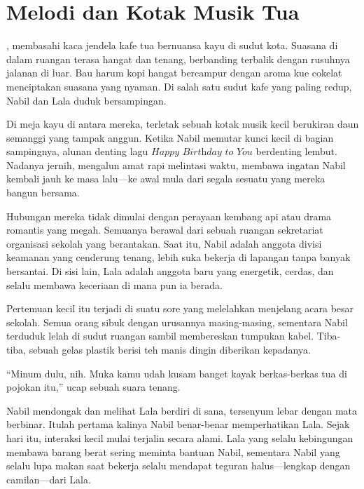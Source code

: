 \chapter*{Melodi dan Kotak Musik Tua}

, membasahi kaca jendela kafe tua bernuansa kayu di sudut kota. Suasana di dalam ruangan terasa hangat dan tenang, berbanding terbalik dengan rusuhnya jalanan di luar. Bau harum kopi hangat bercampur dengan aroma kue cokelat menciptakan suasana yang nyaman. Di salah satu sudut kafe yang paling redup, Nabil dan Lala duduk bersampingan.

Di meja kayu di antara mereka, terletak sebuah kotak musik kecil berukiran daun semanggi yang tampak anggun. Ketika Nabil memutar kunci kecil di bagian sampingnya, alunan denting lagu \(\textit{Happy Birthday to You}\) berdenting lembut. Nadanya jernih, mengalun amat rapi melintasi waktu, membawa ingatan Nabil kembali jauh ke masa lalu—ke awal mula dari segala sesuatu yang mereka bangun bersama.

Hubungan mereka tidak dimulai dengan perayaan kembang api atau drama romantis yang megah. Semuanya berawal dari sebuah ruangan sekretariat organisasi sekolah yang berantakan. Saat itu, Nabil adalah anggota divisi keamanan yang cenderung tenang, lebih suka bekerja di lapangan tanpa banyak bersantai. Di sisi lain, Lala adalah anggota baru yang energetik, cerdas, dan selalu membawa keceriaan di mana pun ia berada.

Pertemuan kecil itu terjadi di suatu sore yang melelahkan menjelang acara besar sekolah. Semua orang sibuk dengan urusannya masing-masing, sementara Nabil terduduk lelah di sudut ruangan sambil membereskan tumpukan kabel. Tiba-tiba, sebuah gelas plastik berisi teh manis dingin diberikan kepadanya.

``Minum dulu, nih. Muka kamu udah kusam banget kayak berkas-berkas tua di pojokan itu,'' ucap sebuah suara tenang.

Nabil mendongak dan melihat Lala berdiri di sana, tersenyum lebar dengan mata berbinar. Itulah pertama kalinya Nabil benar-benar memperhatikan Lala. Sejak hari itu, interaksi kecil mulai terjalin secara alami. Lala yang selalu kebingungan membawa barang berat sering meminta bantuan Nabil, sementara Nabil yang selalu lupa makan saat bekerja selalu mendapat teguran halus—lengkap dengan camilan—dari Lala.

